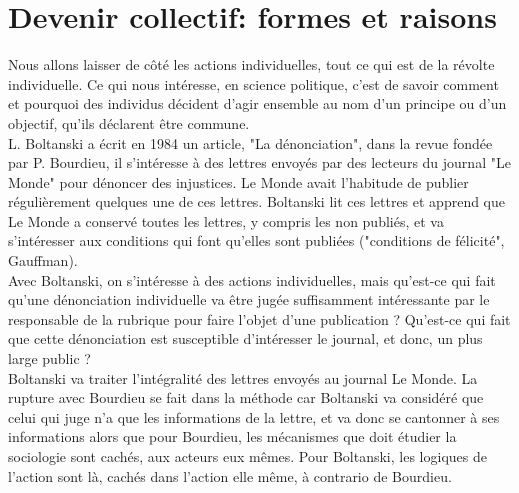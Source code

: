 \documentclass[10pt, a4paper, openany]{book}
\begin{document}
\section{Devenir collectif: formes et raisons}

Nous allons laisser de côté les actions individuelles, tout ce qui est de la révolte individuelle. Ce qui nous intéresse, en science politique, c'est de savoir comment et pourquoi des individus décident d'agir ensemble au nom d'un principe ou d'un objectif, qu'ils déclarent être commune. \\
L. Boltanski a écrit en 1984 un article, "La dénonciation", dans la revue fondée par P. Bourdieu, il s'intéresse à des lettres envoyés par des lecteurs du journal "Le Monde" pour dénoncer des injustices. Le Monde avait l'habitude de publier régulièrement quelques une de ces lettres. Boltanski lit ces lettres et apprend que Le Monde a conservé toutes les lettres, y compris les non publiés, et va s'intéresser aux conditions qui font qu'elles sont publiées ("conditions de félicité", Gauffman). \\
Avec Boltanski, on s'intéresse à des actions individuelles, mais qu'est-ce qui fait qu'une dénonciation individuelle va être jugée suffisamment intéressante par le responsable de la rubrique pour faire l'objet d'une publication ? Qu'est-ce qui fait que cette dénonciation est susceptible d'intéresser le journal, et donc, un plus large public ? \\
Boltanski va traiter l'intégralité des lettres envoyés au journal Le Monde. La rupture avec Bourdieu se fait dans la méthode car Boltanski va considéré que celui qui juge n'a que les informations de la lettre, et va donc se cantonner à ses informations alors que pour Bourdieu, les mécanismes que doit étudier la sociologie sont cachés, aux acteurs eux mêmes. Pour Boltanski, les logiques de l'action sont là, cachés dans l'action elle même, à contrario de Bourdieu.
\end{document}
